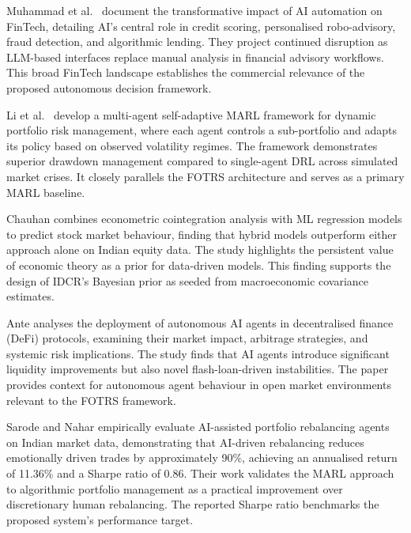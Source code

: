 \documentclass[12pt,a4paper,oneside]{report}
\theoremstyle{definition}
\theoremstyle{remark}
\begin{document}
\medskip

\noindent Muhammad et al.\ \cite{Muhammad2024AIFintech} document the transformative impact of AI automation on FinTech, detailing AI's central role in credit scoring, personalised robo-advisory, fraud detection, and algorithmic lending. They project continued disruption as LLM-based interfaces replace manual analysis in financial advisory workflows. This broad FinTech landscape establishes the commercial relevance of the proposed autonomous decision framework.

\medskip

\noindent Li et al.\ \cite{LiMASA2024} develop a multi-agent self-adaptive MARL framework for dynamic portfolio risk management, where each agent controls a sub-portfolio and adapts its policy based on observed volatility regimes. The framework demonstrates superior drawdown management compared to single-agent DRL across simulated market crises. It closely parallels the FOTRS architecture and serves as a primary MARL baseline.

\medskip

\noindent Chauhan \cite{Chauhan2025HybridPrediction} combines econometric cointegration analysis with ML regression models to predict stock market behaviour, finding that hybrid models outperform either approach alone on Indian equity data. The study highlights the persistent value of economic theory as a prior for data-driven models. This finding supports the design of IDCR's Bayesian prior as seeded from macroeconomic covariance estimates.

\medskip

\noindent Ante \cite{Ante2024AIAgentsDeFi} analyses the deployment of autonomous AI agents in decentralised finance (DeFi) protocols, examining their market impact, arbitrage strategies, and systemic risk implications. The study finds that AI agents introduce significant liquidity improvements but also novel flash-loan-driven instabilities. The paper provides context for autonomous agent behaviour in open market environments relevant to the FOTRS framework.

\medskip

\noindent Sarode and Nahar \cite{Sarode2025AIRebalancing} empirically evaluate AI-assisted portfolio rebalancing agents on Indian market data, demonstrating that AI-driven rebalancing reduces emotionally driven trades by approximately 90\%, achieving an annualised return of 11.36\% and a Sharpe ratio of 0.86. Their work validates the MARL approach to algorithmic portfolio management as a practical improvement over discretionary human rebalancing. The reported Sharpe ratio benchmarks the proposed system's performance target.
\end{document}
